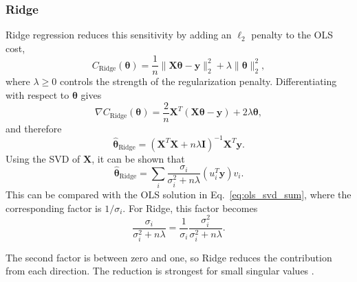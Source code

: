 \documentclass[amssymb,twocolumn,aps]{revtex4}
\begin{document}
\subsubsection{Ridge}
Ridge regression reduces this sensitivity by adding an $\ell_2$ penalty to the OLS cost,
\begin{equation}
    C_{\mathrm{Ridge}}(\boldsymbol{\theta})
    =
    \frac{1}{n}\|\boldsymbol{X}\boldsymbol{\theta}-\mathbf{\boldsymbol{y}}\|_2^2
    +\lambda\|\boldsymbol{\theta}\|_2^2,
    \label{eq:ridge_cost}
\end{equation}
where $\lambda \geq 0$ controls the strength of the regularization penalty.
Differentiating with respect to $\boldsymbol{\theta}$ gives
\[
    \nabla C_{\mathrm{Ridge}}(\boldsymbol{\theta})
    =
    \frac{2}{n}\boldsymbol{X}^T(\boldsymbol{X}{\boldsymbol{\theta}}-\mathbf{\boldsymbol{y}})
    +2\lambda{\boldsymbol{\theta}},
\]
and therefore
\begin{equation}
    \hat{\boldsymbol{\theta}}_{\mathrm{Ridge}}
    =
    (\boldsymbol{X}^T\boldsymbol{X}+n\lambda \boldsymbol{I})^{-1}\boldsymbol{X}^T\mathbf{\boldsymbol{y}}.
    \label{eq:ridge}
\end{equation}
Using the SVD of $\boldsymbol{X}$, it can be shown that \cite{lecturebook}
\begin{equation}
    \hat{\boldsymbol{\theta}}_{\mathrm{Ridge}}
    =
    \sum_i
    \frac{\sigma_i}
    {\sigma_i^2+n\lambda}
    (u_i^T\mathbf{\boldsymbol{y}})v_i.
    \label{eq:ridge_svd}
\end{equation}
This can be compared with the OLS solution in Eq.~\eqref{eq:ols_svd_sum}, where the corresponding factor is $1/\sigma_i$. For Ridge, this factor becomes
\[
    \frac{\sigma_i}{\sigma_i^2+n\lambda}
    =
    \frac{1}{\sigma_i}
    \frac{\sigma_i^2}{\sigma_i^2+n\lambda}.
\]

The second factor is between zero and one, so Ridge reduces the contribution from each direction. The reduction is strongest for small singular values \cite{lecturebook}.
\end{document}
